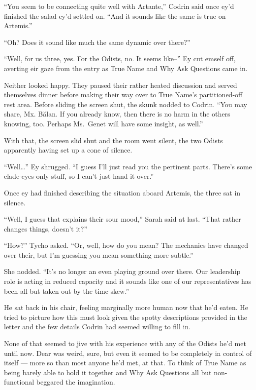 ``You seem to be connecting quite well with Artante,'' Codrin said once ey'd finished the salad ey'd settled on. ``And it sounds like the same is true on Artemis.''

``Oh? Does it sound like much the same dynamic over there?''

``Well, for us three, yes. For the Odists, no. It seems like--'' Ey cut emself off, averting eir gaze from the entry as True Name and Why Ask Questions came in.

Neither looked happy. They paused their rather heated discussion and served themselves dinner before making their way over to True Name's partitioned-off rest area. Before sliding the screen shut, the skunk nodded to Codrin. ``You may share, Mx. Bălan. If you already know, then there is no harm in the others knowing, too. Perhaps Ms.~Genet will have some insight, as well.''

With that, the screen slid shut and the room went silent, the two Odists apparently having set up a cone of silence.

``Well\ldots{}'' Ey shrugged. ``I guess I'll just read you the pertinent parts. There's some clade-eyes-only stuff, so I can't just hand it over.''

Once ey had finished describing the situation aboard Artemis, the three sat in silence.

``Well, I guess that explains their sour mood,'' Sarah said at last. ``That rather changes things, doesn't it?''

``How?'' Tycho asked. ``Or, well, how do you mean? The mechanics have changed over their, but I'm guessing you mean something more subtle.''

She nodded. ``It's no longer an even playing ground over there. Our leadership role is acting in reduced capacity and it sounds like one of our representatives has been all but taken out by the time skew.''

He sat back in his chair, feeling marginally more human now that he'd eaten. He tried to picture how this must look given the spotty descriptions provided in the letter and the few details Codrin had seemed willing to fill in.

None of that seemed to jive with his experience with any of the Odists he'd met until now. Dear was weird, sure, but even it seemed to be completely in control of itself — more so than most anyone he'd met, at that. To think of True Name as being barely able to hold it together and Why Ask Questions all but non-functional beggared the imagination.


